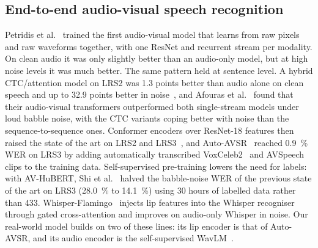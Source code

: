 \subsection{End-to-end audio-visual speech recognition}
Petridis et al.~\cite{petridis2018e2e} trained the first audio-visual model that learns from raw
pixels and raw waveforms together, with one ResNet and recurrent stream per modality. On clean
audio it was only slightly better than an audio-only model, but at high noise levels it was much
better. The same pattern held at sentence level. A hybrid CTC/attention model on LRS2 was 1.3 points
better than audio alone on clean speech and up to 32.9 points better in noise~\cite{petridis2018hybrid},
and Afouras et al.~\cite{afouras2022} found that their audio-visual transformers outperformed both
single-stream models under loud babble noise, with the CTC variants coping better with noise than
the sequence-to-sequence ones. Conformer encoders over ResNet-18 features then raised the state of
the art on LRS2 and LRS3~\cite{ma2021}, and Auto-AVSR~\cite{ma2023} reached 0.9~\% WER on LRS3 by
adding automatically transcribed VoxCeleb2~\cite{chung2018voxceleb2} and AVSpeech clips to the
training data. Self-supervised pre-training lowers the need for labels: with AV-HuBERT, Shi
et al.~\cite{shi2022robust} halved the babble-noise WER of the previous state of the art on LRS3
(28.0~\% to 14.1~\%) using 30 hours of labelled data rather than 433. Whisper-Flamingo~\cite{rouditchenko2024}
injects lip features into the Whisper recogniser~\cite{radford2023whisper} through gated
cross-attention and improves on audio-only Whisper in noise. Our real-world model builds on two of
these lines: its lip encoder is that of Auto-AVSR, and its audio encoder is the self-supervised
WavLM~\cite{chen2022wavlm}.


